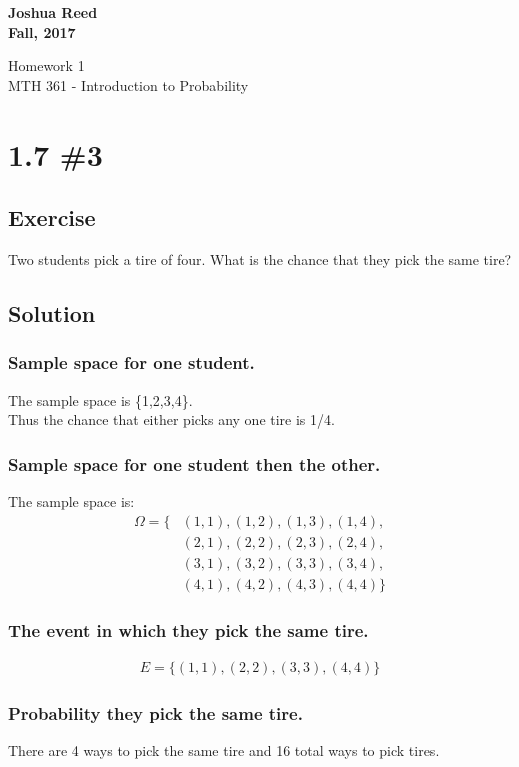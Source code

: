 \documentclass[12pt]{article}
\begin{document}
{%
  \large \bfseries 
  Joshua Reed \\
  Fall, 2017 \\
  \begin{center}
    {\huge Homework 1}\\
    MTH 361 - Introduction to Probability%
  \end{center}}
 
 
\section{1.7 \#3} 
\subsection{Exercise}
Two students pick a tire of four. What is the chance that they pick the same tire?

\subsection{Solution}
\subsubsection{Sample space for one student.}
The sample space is \{1,2,3,4\}. \\
Thus the chance that either picks any one tire is 1/4. 

\subsubsection{Sample space for one student then the other.}
The sample space is:
\begin{align*}
\Omega = \{&(1,1),(1,2),(1,3),(1,4),\\
           &(2,1),(2,2),(2,3),(2,4),\\
           &(3,1),(3,2),(3,3),(3,4),\\
           &(4,1),(4,2),(4,3),(4,4)\}
\end{align*}

\subsubsection{The event in which they pick the same tire.}
\begin{align*}
E = \{(1,1),(2,2),(3,3),(4,4)\}
\end{align*}

\subsubsection{Probability they pick the same tire.}
There are 4 ways to pick the same tire and 16 total ways to pick tires.
\end{document}
